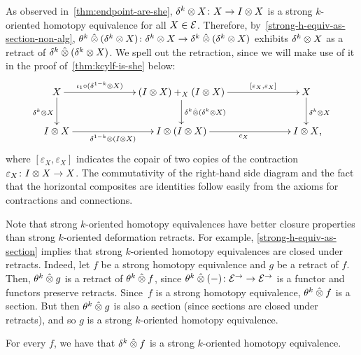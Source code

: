 \documentclass[reqno,10pt,a4paper,oneside,draft]{amsart}
\begin{document}
{{As observed in~\cref{thm:endpoint-are-she}, $\kcyl \otimes X \co X \to \interval \otimes X$ is a strong $k$-oriented homotopy equivalence for all $X \in \cal{E}$.
Therefore, by~\cref{strong-h-equiv-as-section-non-alg}, $\thetak \hatotimes (\kcyl \otimes X)  \co \kcyl \otimes X \to \kcyl \hatotimes (\kcyl \otimes X)$ exhibits $\kcyl \otimes X$ as a retract of
$\kcyl \hatotimes (\kcyl \otimes X)$. We spell out the retraction, since we will make use of it in the proof of~\cref{thm:kcylf-is-she} below:
\begin{equation}
\label{equ:kcyl-as-retract}
\begin{gathered}
\xymatrix@C+4em{
  X
  \ar[r]^-{\iota_1 \cc (\kcylinv \otimes X)}
  \ar[d]_{\kcyl \otimes X}
&
  (\interval \otimes X) +_X (\interval \otimes X)
  \ar[d]^{\kcyl \hatotimes (\kcyl \otimes X)}
  \ar[r]^-{[\varepsilon_X, \varepsilon_X]}
&
  X
  \ar[d]^{\kcyl \otimes X}
\\
  \interval \otimes X
  \ar[r]_-{\kcylinv \otimes (\interval \otimes X)}
&
  \interval \otimes (\interval \otimes X)
  \ar[r]_{c_X}
&
  \interval \otimes X
\rlap{,}}
\end{gathered}
\end{equation}
where $[\varepsilon_X, \varepsilon_X]$ indicates the copair of two copies of the contraction $\varepsilon_X \co \interval \otimes X \to X$. The commutativity of the right-hand side diagram
and the fact that the horizontal composites are identities follow easily from the axioms for contractions and connections.


Note that strong $k$-oriented homotopy equivalences have better closure properties than strong $k$-oriented deformation retracts.
For example, \cref{strong-h-equiv-as-section} implies that strong $k$-oriented homotopy equivalences are closed under retracts.
Indeed, let $f$ be a strong homotopy equivalence and $g$ be a retract of $f$.
Then, $\thetak \hatotimes g$ is a retract of $\thetak \hatotimes f$, since $\thetak \hatotimes (-) \co \catE^\to \to \catE^\to$ is a functor and functors preserve retracts.
Since~$f$ is a strong homotopy equivalence, $\thetak \hatotimes f$ is a section.
But then $\thetak \hatotimes g$ is also a section (since sections are closed under retracts), and so $g$ is a strong $k$-oriented homotopy equivalence.

\begin{lemma} \label{thm:kcylf-is-she}
For every $f$, we have that $\kcyl \hatotimes f$ is a strong $k$-oriented homotopy equivalence.
\end{lemma}

}}
\end{document}
